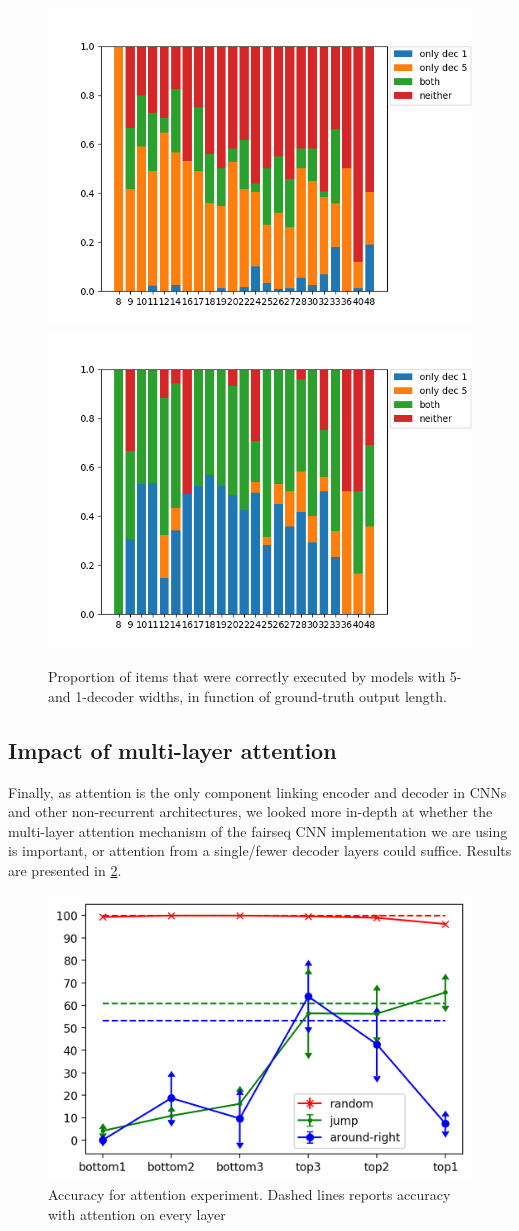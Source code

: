 \begin{figure}[tb]
    \centering
    \includegraphics[width=.4\textwidth,keepaspectratio]{figures/jump_subset_out.png}
    \includegraphics[width=.4\textwidth,keepaspectratio]{figures/template_subset_out.png}
    \caption{Proportion of items that were correctly executed by
      models with 5- and 1-decoder widths, in function of ground-truth
      output length. }
    \label{fig:kernel_width}
\end{figure}

\subsection{Impact of multi-layer attention}
\label{subsec:exp3}

Finally, as attention is the only component linking encoder and
decoder in CNNs and other non-recurrent architectures, we looked more
in-depth at whether the multi-layer attention mechanism of the fairseq 
CNN implementation we are using is important, or attention from a
single/fewer decoder layers could suffice. Results are presented in
\ref{fig:exp3}.

\begin{figure}[h]
    \centering
    \includegraphics[width=.5\textwidth,keepaspectratio]{figures/attention_exp.png}
    \caption{Accuracy for attention experiment. Dashed lines reports accuracy with attention on every layer}
    \label{fig:exp3}
\end{figure}

